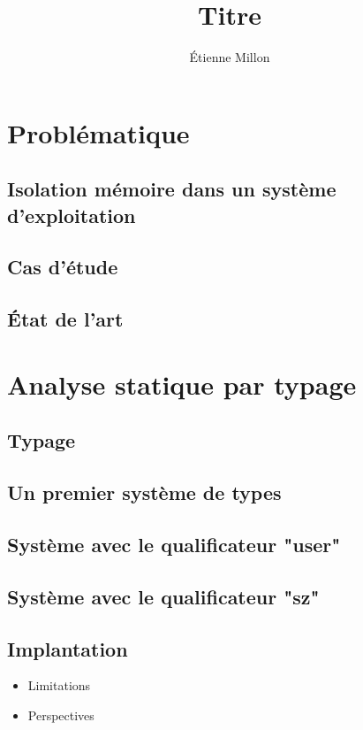 \documentclass[12pt]{phdthesis}
\title{Titre}
\author{Étienne Millon}
\begin{document}

\tableofcontents


\part{Problématique}

\chapter{Isolation mémoire dans un système d'exploitation}



\chapter{Cas d'étude}



\chapter{État de l'art}



\part{Analyse statique par typage}

\chapter{Typage}



\chapter{Un premier système de types}



\chapter{Système avec le qualificateur "user"}



\chapter{Système avec le qualificateur "sz"}

\chapter{Implantation}


\begin{itemize}
  \item Limitations
  \item Perspectives
\end{itemize}




\end{document}
